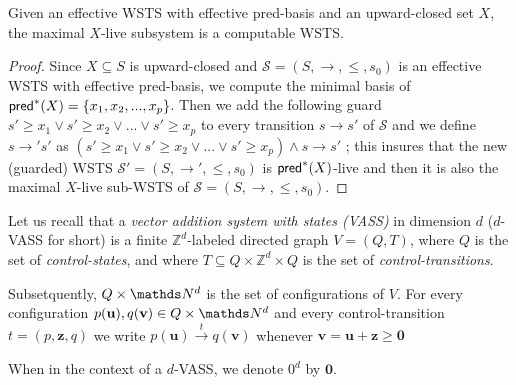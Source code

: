 \begin{theorem}{}
Given an effective WSTS with effective pred-basis and an upward-closed set $X$, the maximal $X$-live subsystem is a computable WSTS.
\end{theorem}

\begin{proof}
Since $X \subseteq S$ is upward-closed and $\mathscr{S}=(S, \rightarrow, \leq,s_0)$ is an effective WSTS with effective pred-basis, we compute the minimal basis of $\textsf{pred}^*(X)=\{x_1,x_2,...,x_p\}$. 
%
%
Then we add the following guard $s' \geq x_1  	\vee s' \geq x_2  	\vee...	\vee s' \geq x_p$ to every transition $s \rightarrow s'$ of $\mathscr{S}$ and we define  $s \rightarrow' s'$ as $(s' \geq x_1  	\vee s' \geq x_2  	\vee...	\vee s' \geq x_p) \wedge s \rightarrow s'$ ; this insures that the new (guarded) WSTS $\mathscr{S'}=(S, \rightarrow', \leq,s_0)$ is $\textsf{pred}^*(X)$-live and then it is also the maximal $X$-live sub-WSTS of $\mathscr{S}=(S, \rightarrow, \leq,s_0)$.

\end{proof}
%
%


Let us recall that a {\em vector addition system with states (VASS)} in dimension $d$ ($d$-VASS for short) is a finite $\mathds{Z}^d$-labeled directed graph $V = (Q,T)$, where $Q$ is the set of {\em control-states}, and where $T \subseteq Q \times \mathds{Z}^d \times Q$ is the set of {\em control-transitions}. 

Subsetquently, $Q \times \N^d$ is the set of configurations of $V$.
For every configuration $p(\textbf{u}), q(\textbf{v}) \in Q \times \N^d$ and every control-transition $t = (p, \textbf{z}, q)$ we write $p(\textbf{u}) \xrightarrow{t} q(\textbf{v})$ whenever $\textbf{v} = \textbf{u} + \textbf{z} \geq \textbf{0}$
%
\iffalse \mathieu{Defining it like this makes it a LTS rather than a unlabeled TS - maybe talk about how we can 'forget' the labels to obtain an unlabeled TS ?}
\alain{les VASS ne sont pas vraiment étiquetés, sauf si on veut le faire, car on peut dire que les VASS sont définis à partir d'un nombre fini de control-transitions  $t = (p, \textbf{z}, q)$ générant une infinité de transtions notées $p(\textbf{u}) \xrightarrow{t} q(\textbf{v})$ puisque pour tout s, $p(\textbf{u+s}) \xrightarrow{t} q(\textbf{v+s})$} \fi
When in the context of a $d$-VASS, we denote $0^d$ by $\textbf{0}$.


